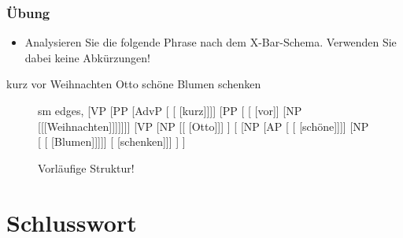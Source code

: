 \begin{frame}
\frametitle{Übung}

\begin{itemize}
	\item Analysieren Sie die folgende Phrase nach dem X-Bar-Schema. Verwenden Sie dabei keine Abkürzungen!
\end{itemize}

\ea kurz vor Weihnachten Otto schöne Blumen schenken
\z

\pause
\begin{figure}[b]
	\begin{minipage}[b]{0.41\textwidth}
	\centering
	\tiny{
		\begin{forest}
		sm edges,
		[VP [PP [AdvP [ [ [kurz]]]]
				[PP [ 	[ [vor]]
								[NP [[[Weihnachten]]]]]]]
			[VP [NP [[ [Otto]]] ]
				[ 	[NP [AP [ [ [schöne]]]]
								[NP [ [ [Blumen]]]]]
							[ [schenken]]]
			]
		]			 
		\end{forest}
		}
		\caption{Vorläufige Struktur!}	
  	\end{minipage}
\end{figure}

\end{frame}


\section{Schlusswort}

